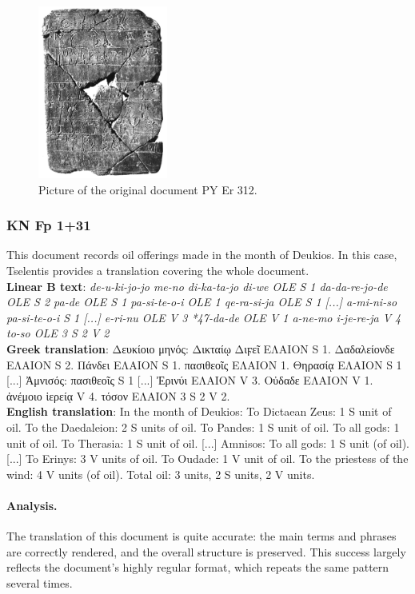 \begin{figure}[H]
  \centering
  \includegraphics[width=0.38\textwidth]{Images/4959.png} %
  \caption{Picture of the original document PY Er 312.}
  \label{fig:doc9}
\end{figure}

\subsubsection{KN Fp 1+31}
This document records oil offerings made in the month of Deukios.
In this case, Tselentis provides a translation covering the whole document. \\
\textbf{Linear B text}: \textit{de-u-ki-jo-jo me-no di-ka-ta-jo di-we OLE S 1 da-da-re-jo-de OLE S 2 pa-de OLE S 1 pa-si-te-o-i OLE 1 qe-ra-si-ja OLE S 1 [...] a-mi-ni-so pa-si-te-o-i S 1 [...] e-ri-nu OLE V 3 *47-da-de OLE V 1 a-ne-mo i-je-re-ja V 4 to-so OLE 3 S 2 V 2} \\
\textbf{Greek translation}: \textgreek{Δευκίοιο μηνός: Δικταίῳ Διϝεῖ ΕΛΑΙΟΝ S 1. Δαδαλείονδε ΕΛΑΙΟΝ S 2. Πάνδει ΕΛΑΙΟΝ S 1. πασιθεοῖς ΕΛΑΙΟΝ 1. Θηρασίᾳ ΕΛΑΙΟΝ S 1 [...] Ἀμνισός: πασιθεοῖς S 1 [...] Ἐρινύι ΕΛΑΙΟΝ V 3. Οὐδαδε ΕΛΑΙΟΝ V 1. ἀνέμοιο ἱερείᾳ V 4. τόσον ΕΛΑΙΟΝ 3 S 2 V 2.} \\
\textbf{English translation}: In the month of Deukios: To Dictaean Zeus: 1 S unit of oil. To the Daedaleion: 2 S units of oil. To Pandes: 1 S unit of oil. To all gods: 1 unit of oil. To Therasia: 1 S unit of oil. [...] Amnisos: To all gods: 1 S unit (of oil). [...] To Erinys: 3 V units of oil. To Oudade: 1 V unit of oil. To the priestess of the wind: 4 V units (of oil). Total oil: 3 units, 2 S units, 2 V units.

\paragraph{Analysis.}
The translation of this document is quite accurate: the main terms and phrases are correctly rendered, and the overall structure is preserved.
This success largely reflects the document's highly regular format, which repeats the same pattern several times.

